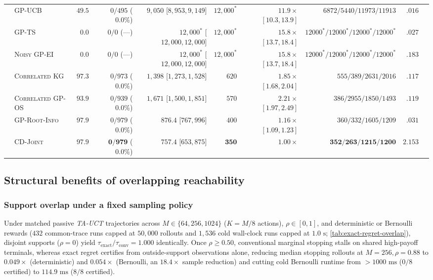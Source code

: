 \documentclass{article}
\theoremstyle{plain}
\theoremstyle{definition}
\begin{document}
\begin{table}[!htbp]
{\begin{tabular}{@{}llrrrrrrrr@{}}
\midrule
{}
 & \textsc{GP-UCB} & $49.5$ & $0/495$ ($0.0\%$) & $9{,}050$ [$8{,}953,9{,}149$] & $12{,}000^*$ & $11.9\times$ $[10.3,13.9]$ & $6872/5440/11973/11913$ & $.016$ \\
 & \textsc{GP-TS} & $0.0$ & $0/0$ (---) & $12{,}000^*$ [$12{,}000,12{,}000$] & $12{,}000^*$ & $15.8\times$ $[13.7,18.4]$ & $12000^*/12000^*/12000^*/12000^*$ & $.027$ \\
 & \textsc{Noisy GP-EI} & $0.0$ & $0/0$ (---) & $12{,}000^*$ [$12{,}000,12{,}000$] & $12{,}000^*$ & $15.8\times$ $[13.7,18.4]$ & $12000^*/12000^*/12000^*/12000^*$ & $.183$ \\
 & \textsc{Correlated KG} & $97.3$ & $0/973$ ($0.0\%$) & $1{,}398$ [$1{,}273,1{,}528$] & $620$ & $1.85\times$ $[1.68,2.04]$ & $555 / 389 / 2631 / 2016$ & $.117$ \\
 & \textsc{Correlated GP-OS} & $93.9$ & $0/939$ ($0.0\%$) & $1{,}671$ [$1{,}500,1{,}851$] & $570$ & $2.21\times$ $[1.97,2.49]$ & $386 / 2955 / 1850 / 1493$ & $.119$ \\
 & \textsc{GP-Root-Info} & $\mathbf{97.9}$ & $0/979$ ($0.0\%$) & $876.4$ [$767,996$] & $400$ & $1.16\times$ $[1.09,1.23]$ & $360 / 332 / 1605 / 1209$ & $.031$ \\
 & \textsc{CD-Joint} & $\mathbf{97.9}$ & $\mathbf{0/979}$ ($0.0\%$) & $\mathbf{757.4}$ [$653,875$] & $\mathbf{350}$ & $1.00\times$ & $\mathbf{352} / \mathbf{263} / \mathbf{1215} / \mathbf{1200}$ & $2.153$ \\
\bottomrule
\end{tabular}%
}
\end{table}

\subsection{Structural benefits of overlapping reachability}
\label{app:overlap-expanded}

\subsubsection{Support overlap under a fixed sampling policy}
\label{sec:exact-regret-experiments}
\label{sec:future-ablation}

Under matched passive \emph{TA-UCT} trajectories across $M\in\{64,256,1024\}$ ($K=M/8$ actions), $\rho\in[0,1]$, and deterministic or Bernoulli rewards ($432$ common-trace runs capped at $50{,}000$ rollouts and $1{,}536$ cold wall-clock runs capped at $1.0\text{ s}$; \cref{tab:exact-regret-overlap}), disjoint supports ($\rho=0$) yield $\tau_{\mathrm{exact}}/\tau_{\mathrm{conv}}=1.000$ identically. Once $\rho\ge 0.50$, conventional marginal stopping stalls on shared high-payoff terminals, whereas exact regret certifies from outside-support observations alone, reducing median stopping rollouts at $M=256,\rho=0.88$ to $0.049\times$ (deterministic) and $0.054\times$ (Bernoulli, an $18.4\times$ sample reduction) and cutting cold Bernoulli runtime from $>1000\text{ ms}$ ($0/8$ certified) to $114.9\text{ ms}$ ($8/8$ certified).
\end{document}
